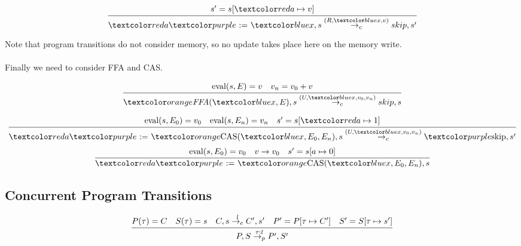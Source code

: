 \begin{minipage}{.5\textwidth}
    \[\cfrac{
        s' = s[\wreg{a} \mapsto v]
    }{
        \wass{\wreg{a}}{\wmem{x}}, s \ctrans{(R, \wmem{x}, v)} skip, s'
    }\]
\end{minipage}
Note that program transitions do not consider memory, so no update takes place here on the memory write.
\\
\\ Finally we need to consider FFA and CAS.
\\ \begin{minipage}{.5\textwidth}
    \[\cfrac{
        \ceval{s}{E} = v \quad v_n = v_0 + v
    }{
        \wffa{\wmem{x}}{E},s \ctrans{(U, \wmem{x}, v_0, v_n)} skip, s
    }\]
\end{minipage}
\begin{minipage}{.5\textwidth}
    \[
        \cfrac{
            \ceval{s}{E_0} = v_0 \quad \ceval{s}{E_n} = v_n \quad s' = s[\wreg{a} \mapsto 1]
        }{
            \wass{\wreg{a}}{\wcas{\wmem{x}}{E_0}{E_n}}, s \ctrans{(U, \wmem{x}, v_0, v_n)} \wskip, s'
        }
    \]
    \[
        \cfrac{
            \ceval{s}{E_0} = v_0 \quad v \to v_0 \quad s' = s[a \mapsto 0]
        }{
            \wass{\wreg{a}}{\wcas{\wmem{x}}{E_0}{E_n}}, s 
        }
    \]    
\end{minipage}

\newcommand{\ptrans}[2]{\overset{#1:#2}{\to_p}}

\subsection{Concurrent Program Transitions}
\[\cfrac{
    P(\tau) = C \quad S(\tau) = s \quad C,s \ctrans{l} C', s' \quad P' = P[\tau \mapsto C'] \quad S'=S[\tau \mapsto s']
}{
    P, S \ptrans{\tau}{l} P', S'
}\]

\newcommand{\mtrans}[2]{\overset{#1:#2}{\to_m}}

